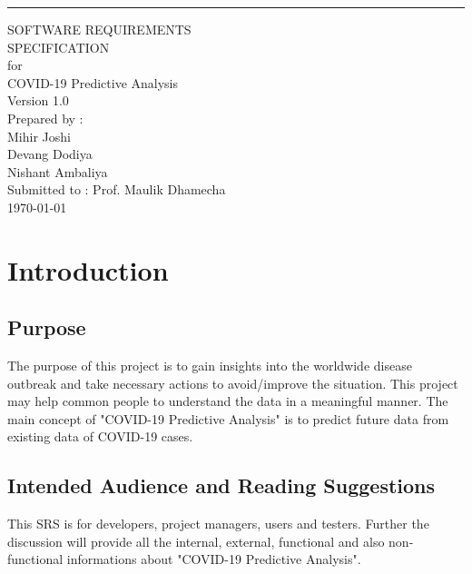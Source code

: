 \documentclass{scrreprt}
\date{}
\def\myversion{1.0 }
\begin{document}
\thispagestyle{empty}
\begin{titlepage}
	\begin{flushright}
	    \rule{16cm}{5pt}\vskip1cm
	    \begin{bfseries}
	        \Huge{SOFTWARE REQUIREMENTS\\ SPECIFICATION}\\
	        \vspace{1.5cm}
	        for\\
	        \vspace{1.5cm}
	        COVID-19 Predictive Analysis\\
	        \vspace{1.5cm}
	        \LARGE{Version \myversion}\\
	        \vspace{1.5cm}
	        Prepared by : \\
	        Mihir Joshi\\
	        Devang Dodiya\\
	        Nishant Ambaliya\\
	        \vspace{1.5cm}
	        Submitted to : Prof. Maulik Dhamecha \\
	        \vspace{1.5cm}
	        \today\\
	    \end{bfseries}
	\end{flushright}
\end{titlepage}
\tableofcontents

\chapter{Introduction}

\section{Purpose}
The purpose of this project is to gain insights into the worldwide disease outbreak and take necessary actions to avoid/improve the situation. This project may help common people to understand the data in a meaningful manner. The main concept of "COVID-19 Predictive Analysis" is to predict future data from existing data of COVID-19 cases.

\section{Intended Audience and Reading Suggestions}
This SRS is for developers, project managers, users and testers. Further the discussion will provide all the internal, external, functional and also non-functional informations about "COVID-19 Predictive Analysis".
\end{document}
